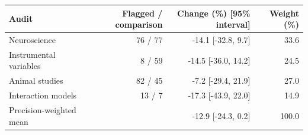 \begin{tabular}{lrrr}
\toprule
Audit & Flagged / comparison & Change (\%) [95\% interval] & Weight (\%) \\
\midrule
Neuroscience & 76 / 77 & -14.1 [-32.8, 9.7] & 33.6 \\
Instrumental variables & 8 / 59 & -14.5 [-36.0, 14.2] & 24.5 \\
Animal studies & 82 / 45 & -7.2 [-29.4, 21.9] & 27.0 \\
Interaction models & 13 / 7 & -17.3 [-43.9, 22.0] & 14.9 \\
Precision-weighted mean &  & -12.9 [-24.3, 0.2] & 100.0 \\
\bottomrule
\end{tabular}

